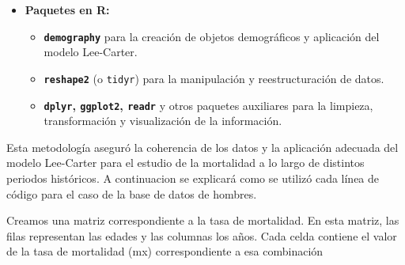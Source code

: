 \documentclass[
]{article}
\newenvironment{Shaded}{\begin{snugshade}}{\end{snugshade}}
\newcommand{\AttributeTok}[1]{\textcolor[rgb]{0.77,0.63,0.00}{#1}}
\newcommand{\DecValTok}[1]{\textcolor[rgb]{0.00,0.00,0.81}{#1}}
\newcommand{\FunctionTok}[1]{\textcolor[rgb]{0.00,0.00,0.00}{#1}}
\newcommand{\NormalTok}[1]{#1}
\newcommand{\OtherTok}[1]{\textcolor[rgb]{0.56,0.35,0.01}{#1}}
\newcommand{\SpecialCharTok}[1]{\textcolor[rgb]{0.00,0.00,0.00}{#1}}
\newcommand{\StringTok}[1]{\textcolor[rgb]{0.31,0.60,0.02}{#1}}
\providecommand{\tightlist}{%
  \setlength{\itemsep}{0pt}\setlength{\parskip}{0pt}}
\begin{document}
\begin{enumerate}
  \begin{itemize}
  \tightlist
  \item
    \textbf{Paquetes en R:}

    \begin{itemize}
    \tightlist
    \item
      \textbf{\texttt{demography}} para la creación de objetos
      demográficos y aplicación del modelo Lee-Carter.\\
    \item
      \textbf{\texttt{reshape2}} (o \texttt{tidyr}) para la manipulación
      y reestructuración de datos.\\
    \item
      \textbf{\texttt{dplyr}, \texttt{ggplot2}, \texttt{readr}} y otros
      paquetes auxiliares para la limpieza, transformación y
      visualización de la información.
    \end{itemize}
  \end{itemize}
\end{enumerate}

Esta metodología aseguró la coherencia de los datos y la aplicación
adecuada del modelo Lee-Carter para el estudio de la mortalidad a lo
largo de distintos periodos históricos. A continuacion se explicará como
se utilizó cada línea de código para el caso de la base de datos de
hombres.

\begin{Shaded}
\end{Shaded}

Creamos una matriz correspondiente a la tasa de mortalidad. En esta
matriz, las filas representan las edades y las columnas los años. Cada
celda contiene el valor de la tasa de mortalidad (mx) correspondiente a
esa combinación
\end{document}
